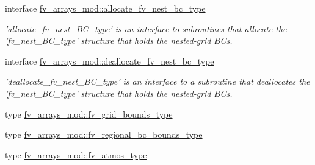 \begin{DoxyCompactItemize}
\item 
interface \hyperlink{interfacefv__arrays__mod_1_1allocate__fv__nest__bc__type}{fv\-\_\-arrays\-\_\-mod\-::allocate\-\_\-fv\-\_\-nest\-\_\-bc\-\_\-type}
\begin{DoxyCompactList}\small\item\em 'allocate\-\_\-fv\-\_\-nest\-\_\-\-B\-C\-\_\-type' is an interface to subroutines that allocate the 'fv\-\_\-nest\-\_\-\-B\-C\-\_\-type' structure that holds the nested-\/grid B\-Cs. \end{DoxyCompactList}\item 
interface \hyperlink{interfacefv__arrays__mod_1_1deallocate__fv__nest__bc__type}{fv\-\_\-arrays\-\_\-mod\-::deallocate\-\_\-fv\-\_\-nest\-\_\-bc\-\_\-type}
\begin{DoxyCompactList}\small\item\em 'deallocate\-\_\-fv\-\_\-nest\-\_\-\-B\-C\-\_\-type' is an interface to a subroutine that deallocates the 'fv\-\_\-nest\-\_\-\-B\-C\-\_\-type' structure that holds the nested-\/grid B\-Cs. \end{DoxyCompactList}\item 
type \hyperlink{structfv__arrays__mod_1_1fv__grid__bounds__type}{fv\-\_\-arrays\-\_\-mod\-::fv\-\_\-grid\-\_\-bounds\-\_\-type}
\item 
type \hyperlink{structfv__arrays__mod_1_1fv__regional__bc__bounds__type}{fv\-\_\-arrays\-\_\-mod\-::fv\-\_\-regional\-\_\-bc\-\_\-bounds\-\_\-type}
\item 
type \hyperlink{structfv__arrays__mod_1_1fv__atmos__type}{fv\-\_\-arrays\-\_\-mod\-::fv\-\_\-atmos\-\_\-type}
\end{DoxyCompactItemize}
